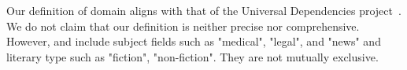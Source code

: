 Our definition of domain aligns with that of the Universal Dependencies project~\citep{nivreUniversalDependenciesV12016}. We do not claim that our definition is neither precise nor comprehensive. However, 
and include subject fields such as "medical", "legal", and "news" and literary type such as "fiction", "non-fiction". They are not mutually exclusive.
